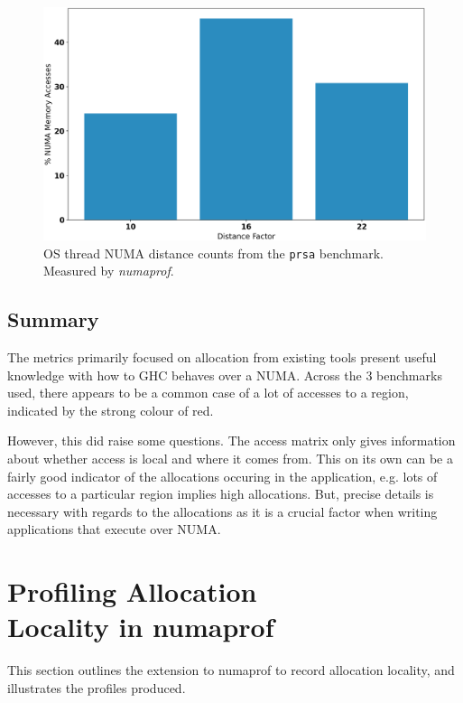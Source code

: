 \documentclass{paper}\usepackage{graphicx}
\begin{document}
\begin{figure}[!htb]
    \centering
    \includegraphics[width=\linewidth]{Paper/images/prsa/prsa_dist.png}
    \caption{OS thread NUMA distance counts from the \lstinline{prsa} benchmark. Measured by \textit{numaprof}.}
    \label{fig:prsa_dist}
\end{figure}

\subsection{Summary}
\label{sec:summary}

The metrics primarily focused on allocation from existing tools present useful knowledge with how to GHC behaves over a NUMA. Across the 3 benchmarks used, there appears to be a common case of a lot of accesses to a region, indicated by the strong colour of red.

However, this did raise some questions. The access matrix only gives information about whether access is local and where it comes from. This on its own can be a fairly good indicator of the allocations occuring in the application, e.g. lots of accesses to a particular region implies high allocations. But, precise details is necessary with regards to the allocations as it is a crucial factor when writing applications that execute over NUMA.

\section{Profiling Allocation \\ Locality in numaprof}
\label{sec:extnumaprof}

This section outlines the extension to numaprof to record allocation locality, and illustrates the profiles produced.
\end{document}
